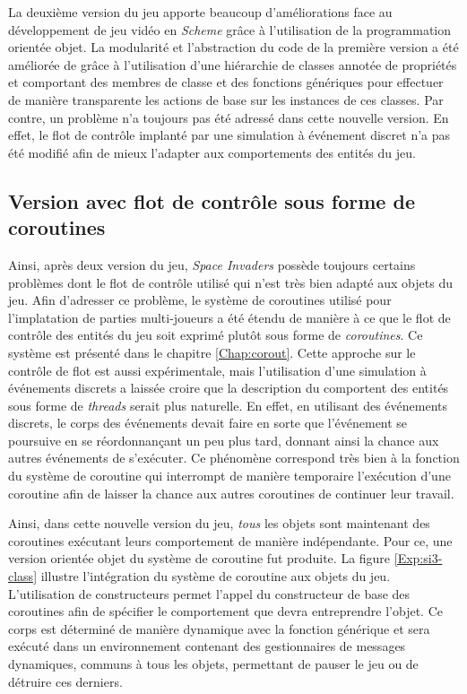 \documentclass[12pt,twoside,letterpaper,francais]{book}
\newcommand{\si}{{\textit{Space Invaders }}}
\newcommand{\Schemelang}{{\textit{Scheme }}}
\newcommand{\scheme}[1]{\selectlanguage{english}{\tt #1}\selectlanguage{french}}
\begin{document}
La deuxième version du jeu apporte beaucoup d'améliorations face au
développement de jeu vidéo en \Schemelang grâce à l'utilisation de la
programmation orientée objet. La modularité et l'abstraction du code
de la première version a été améliorée de grâce à l'utilisation d'une
hiérarchie de classes annotée de propriétés et comportant des membres
de classe et des fonctions génériques pour effectuer de manière
transparente les actions de base sur les instances de ces classes. Par
contre, un problème n'a toujours pas été adressé dans cette nouvelle
version. En effet, le flot de contrôle implanté par une simulation à
événement discret n'a pas été modifié afin de mieux l'adapter aux
comportements des entités du jeu.


\FloatBarrier
\subsection{Version avec flot de contrôle sous forme de coroutines} \label{Exp:sp3}
Ainsi, après deux version du jeu, \si possède toujours certains
problèmes dont le flot de contrôle utilisé qui n'est très bien adapté
aux objets du jeu. Afin d'adresser ce problème, le système de
coroutines utilisé pour l'implatation de parties multi-joueurs a été
étendu de manière à ce que le flot de contrôle des entités du jeu soit
exprimé plutôt sous forme de \emph{coroutines}. Ce système est
présenté dans le chapitre \ref{Chap:corout}. Cette approche sur le
contrôle de flot est aussi expérimentale, mais l'utilisation d'une
simulation à événements discrets a laissée croire que la description
du comportent des entités sous forme de \textit{threads} serait plus
naturelle. En effet, en utilisant des événements discrets, le corps
des événements devait faire en sorte que l'événement se poursuive en
se réordonnançant un peu plus tard, donnant ainsi la chance aux autres
événements de s'exécuter. Ce phénomène correspond très bien à la
fonction \scheme{yield} du système de coroutine qui interrompt de
manière temporaire l'exécution d'une coroutine afin de laisser la
chance aux autres coroutines de continuer leur travail.

Ainsi, dans cette nouvelle version du jeu, \emph{tous} les objets sont
maintenant des coroutines exécutant leurs comportement de manière
indépendante. Pour ce, une version orientée objet du système de
coroutine fut produite. La figure \ref{Exp:si3-class} illustre
l'intégration du système de coroutine aux objets du jeu. L'utilisation
de constructeurs permet l'appel du constructeur de base des coroutines
afin de spécifier le comportement que devra entreprendre l'objet. Ce
corps est déterminé de manière dynamique avec la fonction générique
\scheme{behaviour} et sera exécuté dans un environnement contenant des
gestionnaires de messages dynamiques, communs à tous les objets,
permettant de pauser le jeu ou de détruire ces derniers.\\
\end{document}
